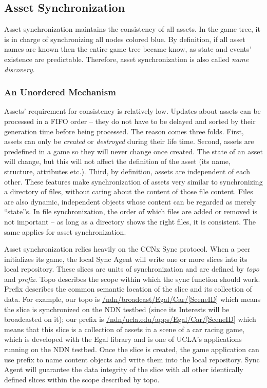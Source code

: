 \documentclass{sigchi}
\begin{document}
\subsection{Asset Synchronization}
\label{assetsync}

Asset synchronization maintains the consistency of all assets. In the game tree, it is in charge of synchronizing all nodes colored blue. By definition, if all asset names are known then the entire game tree became know, as state and events' existence are predictable. Therefore, asset synchronization is also called \emph{name discovery}.

\subsubsection{An Unordered Mechanism}

Assets' requirement for consistency is relatively low. Updates about assets can be processed in a FIFO order -- they do not have to be delayed and sorted by their generation time before being processed. The reason comes three folds. First, assets can only be \emph{created} or \emph{destroyed} during their life time. Second, assets are predefined in a game so they will never change once created. The state of an asset will change, but this will not affect the definition of the asset (its name, structure, attributes etc.). Third, by definition, assets are independent of each other. These features make synchronization of assets very similar to synchronizing a directory of files, without caring about the content of those file content.  Files are also dynamic, independent objects whose content can be regarded as merely ``state''s. In file synchronization, the order of which files are added or removed is not important -- as long as a directory shows the right files, it is consistent. The same applies for asset synchronization.

Asset synchronization relies heavily on the CCNx Sync protocol. When a peer initializes its game, the local Sync Agent will write one or more slices into its local repository. These slices are units of synchronization and are defined by \emph{topo} and \emph{prefix}. Topo describes the scope within which the sync function should work. Prefix describes the common semantic location of the slice and its collection of data. For example, our topo is \url{/ndn/broadcast/Egal/Car/[SceneID]} which means the slice is synchronized on the NDN testbed (since its Interests will be broadcasted on it); our prefix is \url{/ndn/ucla.edu/apps/Egal/Car/[SceneID]} which means that this slice is a collection of assets in a scene of a car racing game, which is developed with the Egal library and is one of UCLA's applications running on the NDN testbed. Once the slice is created, the game application can use prefix to name content objects and write them into the local repository. Sync Agent will guarantee the data integrity of the slice with all other identically defined slices within the scope described by topo.
\end{document}
